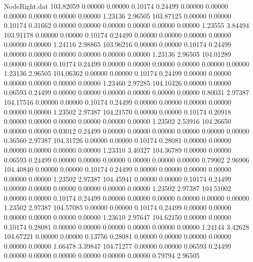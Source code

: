 \begin{filecontents}{NodeRight.dat}
 103.82059    0.00000    0.00000     0.10174    0.24499    0.00000    0.00000    0.00000    0.00000    0.00000    0.00000    1.23136    2.96505
 103.87125    0.00000    0.00000     0.10174    0.31662    0.00000    0.00000    0.00000    0.00000    0.00000    0.00000    1.23555    3.84494
 103.91178    0.00000    0.00000     0.10174    0.24499    0.00000    0.00000    0.00000    0.00000    0.00000    0.00000    1.24116    2.98865
 103.96216    0.00000    0.00000     0.10174    0.24499    0.00000    0.00000    0.00000    0.00000    0.00000    0.00000    1.23136    2.96505
 104.01289    0.00000    0.00000     0.10174    0.24499    0.00000    0.00000    0.00000    0.00000    0.00000    0.00000    1.23136    2.96505
 104.06362    0.00000    0.00000     0.10174    0.24499    0.00000    0.00000    0.00000    0.00000    0.00000    0.00000    1.23460    2.97285
 104.10426    0.00000    0.00000     0.06593    0.24499    0.00000    0.00000    0.00000    0.00000    0.00000    0.00000    0.80031    2.97387
 104.17516    0.00000    0.00000     0.10174    0.24499    0.00000    0.00000    0.00000    0.00000    0.00000    0.00000    1.23502    2.97387
 104.21570    0.00000    0.00000     0.10174    0.20918    0.00000    0.00000    0.00000    0.00000    0.00000    0.00000    1.23502    2.53916
 104.26650    0.00000    0.00000     0.03012    0.24499    0.00000    0.00000    0.00000    0.00000    0.00000    0.00000    0.36560    2.97387
 104.31726    0.00000    0.00000     0.10174    0.28081    0.00000    0.00000    0.00000    0.00000    0.00000    0.00000    1.23310    3.40327
 104.36789    0.00000    0.00000     0.06593    0.24499    0.00000    0.00000    0.00000    0.00000    0.00000    0.00000    0.79902    2.96906
 104.40840    0.00000    0.00000     0.10174    0.24499    0.00000    0.00000    0.00000    0.00000    0.00000    0.00000    1.23502    2.97387
 104.45941    0.00000    0.00000     0.10174    0.24499    0.00000    0.00000    0.00000    0.00000    0.00000    0.00000    1.23502    2.97387
 104.51002    0.00000    0.00000     0.10174    0.24499    0.00000    0.00000    0.00000    0.00000    0.00000    0.00000    1.23502    2.97387
 104.57085    0.00000    0.00000     0.10174    0.24499    0.00000    0.00000    0.00000    0.00000    0.00000    0.00000    1.23610    2.97647
 104.62150    0.00000    0.00000     0.10174    0.28081    0.00000    0.00000    0.00000    0.00000    0.00000    0.00000    1.24144    3.42628
 104.67221    0.00000    0.00000     0.13756    0.28081    0.00000    0.00000    0.00000    0.00000    0.00000    0.00000    1.66478    3.39847
 104.71277    0.00000    0.00000     0.06593    0.24499    0.00000    0.00000    0.00000    0.00000    0.00000    0.00000    0.79794    2.96505

\end{filecontents}
